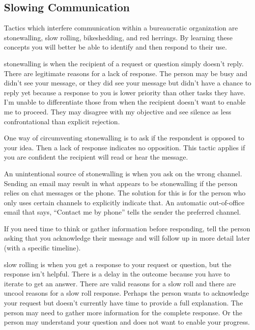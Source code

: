 \subsection*{Slowing Communication\label{sec:slowing-communication}}

Tactics which interfere communication within a bureaucratic organization are stonewalling, slow rolling, bikeshedding, and red herrings. By learning these concepts you will better be able to identify and then respond to their use.

\Gls{stonewalling} 
is when the recipient of a request or question simply doesn't reply. There are legitimate reasons for a lack of response. The person may be busy and didn't see your message, or they did see your message but didn't have a chance to reply yet because a response to you is lower priority than other tasks they have. I'm unable to differentiate those from when the recipient doesn't want to enable me to proceed. They may disagree with my objective and see silence as less confrontational than explicit rejection. 

One way of circumventing stonewalling is to ask if the respondent is opposed to your idea. 
Then a lack of response indicates no opposition. This tactic applies if you are confident the recipient will read or hear the message.

An unintentional source of stonewalling is when you ask on the wrong channel. Sending an email may result in what appears to be stonewalling if the person relies on chat messages or the phone. The solution for this 
is for the person who only uses certain channels to explicitly indicate that. An automatic out-of-office email that says, ``Contact me by phone'' tells the sender the preferred channel.

If you need time to think or gather information before responding, 
tell the person asking that you acknowledge their message and will follow up in more detail later (with a specific timeline). 

\Gls{slow rolling}
is when you get a response to your request or question, but the response isn't helpful. There is a delay in the outcome because you have to iterate to get an answer. There are valid reasons for a slow roll and there are uncool reasons for a slow roll response. Perhaps the person wants to acknowledge your request but doesn't currently have time to provide a full explanation. The person may need to gather more information for the complete response. Or the person may understand your question and does not want to enable your progress. 

